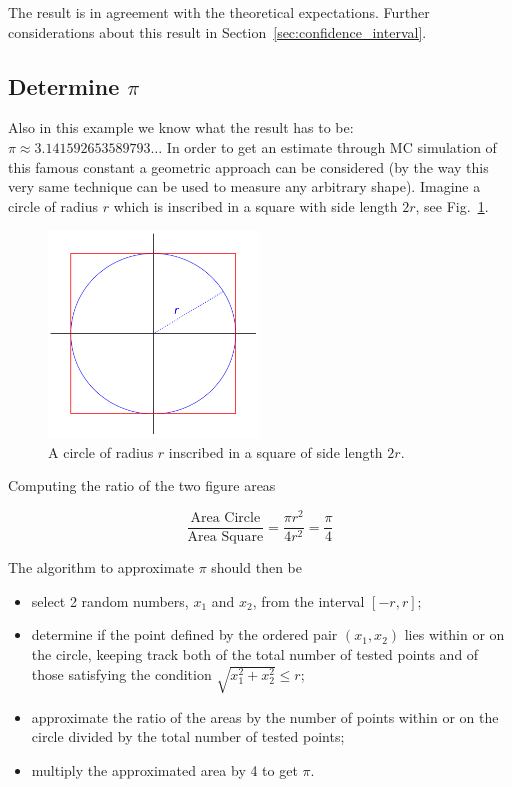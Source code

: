 The result is in agreement with the theoretical expectations. Further considerations about this result in Section~\ref{sec:confidence_interval}.

\subsection{Determine $\pi$}
\label{determine-pi}

Also in this example we know what the result has to be: $\pi\approx 3.141592653589793\ldots$ In order to get an estimate through MC simulation of this famous constant a geometric approach can be considered (by the way this very same technique can be used to measure any arbitrary shape). Imagine a circle of radius $r$ which is inscribed in a square with side length $2r$, see Fig.~\ref{fig:circle_inscribed}.

\begin{figure}[htb]
\centering
\includegraphics[width=0.5\textwidth]{figures/circle_inscribed}
\caption{A circle of radius $r$ inscribed in a square of side length $2r$.}
\label{fig:circle_inscribed}
\end{figure}

Computing the ratio of the two figure areas

\begin{equation}
\frac{\textrm{Area Circle}}{\textrm{Area Square}} = \frac{\pi r^2}{4r^2} = \frac{\pi}{4} 
\end{equation}

The algorithm to approximate $\pi$ should then be

\begin{itemize}
\item select 2 random numbers, $x_1$ and $x_2$, from the interval
$[-r,r]$; 
\item determine if the point defined by the ordered pair $(x_1, x_2)$ lies within or on the circle, keeping track both of the total number of tested points and of those satisfying the condition $\sqrt{x_1^2 + x_2^2}\leq r$; 
\item approximate the ratio of the areas by the number of points within or on the circle divided by the total number of tested points; 
\item multiply the approximated area by 4 to get $\pi$.
\end{itemize}

